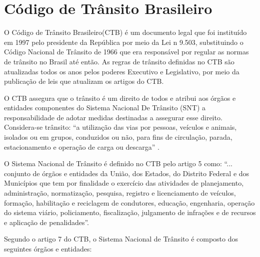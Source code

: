 \section{Código de Trânsito Brasileiro}


    O Código de Trânsito Brasileiro(CTB) é um documento legal que foi instituído em 1997 pelo presidente da República por meio da Lei n 9.503, substituindo o Código Nacional de Trânsito de 1966 que era responsável por regular as normas de trânsito no Brasil até então. As regras de trânsito definidas no CTB são atualizadas todos os anos pelos poderes Executivo e Legislativo, por meio da publicação de leis que atualizam os artigos do CTB.

    O CTB assegura que o trânsito é um direito de todos e atribui aos órgãos e entidades componentes do Sistema Nacional De Trânsito (SNT) a responsabilidade de adotar medidas destinadas a assegurar esse direito. Considera-se trânsito: “a utilização das vias por pessoas, veículos e animais, isolados ou em grupos, conduzidos ou não, para fins de circulação, parada, estacionamento e operação de carga ou descarga” \cite{codigo_transito_bra}.
    
    O Sistema Nacional de Trânsito é definido no CTB pelo artigo 5 como: “{...} conjunto de órgãos e entidades da União, dos Estados, do Distrito Federal e dos Municípios que tem por finalidade o exercício das atividades de planejamento, administração, normatização, pesquisa, registro e licenciamento de veículos, formação, habilitação e reciclagem de condutores, educação, engenharia, operação do sistema viário, policiamento, fiscalização, julgamento de infrações e de recursos e aplicação de penalidades”.

    Segundo o artigo 7 do CTB, o Sistema Nacional de Trânsito é composto dos seguintes órgãos e entidades:
    
